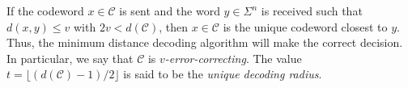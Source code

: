 \documentclass[../main.tex]{subfiles}
\begin{document}
If the codeword $x \in \mathcal{C}$ is sent and the word $y \in \Sigma^n$ is received such that $d(x, y) \leq v$ with $2v < d(\mathcal{C})$, then $x \in \mathcal{C}$ is the unique codeword closest to $y$. Thus, the minimum distance decoding algorithm will make the correct decision. In particular, we say that $\mathcal{C}$ is \emph{$v$-error-correcting}. The value $t = \lfloor (d(\mathcal{C}) - 1) / 2 \rfloor$ is said to be the \emph{unique decoding radius}.







\end{document}
